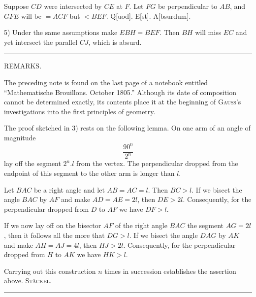 Suppose $CD$ were intersected by $CE$ at $F$. Let $FG$ be perpendicular to $AB$,
and $GFE$ will be $= ACF$ but $< BEF$. Q[uod]. E[st]. A[bsurdum].

5) Under the same assumptions make $EBH = BEF$. Then $BH$ will miss $EC$
and yet intersect the parallel $CJ$, which is absurd.

\bigskip
\hrule
\bigskip

\begin{center}REMARKS.\end{center}

\smallskip

The preceding note is found on the last page of a notebook entitled “Mathematische Brouillons. October 1805.” Although its date of composition cannot be determined exactly, its contents place it at the beginning of \textsc{Gauss}'s investigations into the first principles of geometry.

The proof sketched in 3) rests on the following lemma. On one arm of an angle of magnitude
\[
\frac{90^{0}}{2^n}
\]
lay off the segment $2^n.l$ from the vertex. The perpendicular dropped from the endpoint of this segment to the other arm is longer than $l$.

\begin{center}\end{center}

Let $BAC$ be a right angle and let $AB = AC = l$. Then $BC > l$. If we bisect the angle $BAC$ by $AF$ and make $AD = AE = 2l$, then $DE > 2l$. Consequently, for the perpendicular dropped from $D$ to $AF$ we have $DF > l$.

If we now lay off on the bisector $AF$ of the right angle $BAC$ the segment $AG = 2l$, then it follows all the more that $DG > l$. If we bisect the angle $DAG$ by $AK$ and make $AH = AJ = 4l$, then $HJ > 2l$. Consequently, for the perpendicular dropped from $H$ to $AK$ we have $HK > l$.

Carrying out this construction $n$ times in succession establishes the assertion above.
\hfill \textsc{Stäckel}.

\bigskip
\hrule
